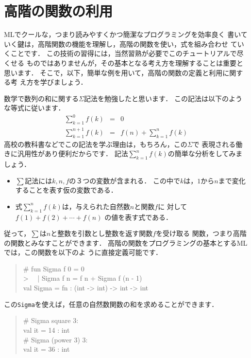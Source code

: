 \documentclass{jbook}
\newif\ifjp
\newcommand{\txt}[2]{#1}
\begin{document}
\section{\txt{高階の関数の利用}{Using higher-order functions}}
\label{sec:tutorialHeigher-order-use}


\ifjp%
	MLでクールな，つまり読みやすくかつ簡潔なプログラミングを効率良く
書いていく鍵は，高階関数の機能を理解し，高階の関数を使い，式を組み合わせ
ていくことです．
	この技術の習得には，当然習熟が必要でこのチュートリアルで尽くせる
ものではありませんが，その基本となる考え方を理解することは重要と思います．
	そこで，以下，簡単な例を用いて，高階の関数の定義と利用に関する考
え方を学びましょう．

	数学で数列の和に関する$\Sigma$記法を勉強したと思います．
	この記法は以下のような等式に従います．
\begin{eqnarray*}
\sum_{k=1}^0 f(k) &=& 0\\
\sum_{k=1}^{n+1} f(k) &=& f(n) + \sum_{k=1}^{n} f(k)
\end{eqnarray*}
	高校の教科書などでこの記法を学ぶ理由は，もちろん，この$\Sigma$で
表現される働きに汎用性があり便利だからです．
	記法$\sum_{k=1}^n f(k)$の簡単な分析をしてみましょう．
\begin{itemize}
\item $\sum$記法には$k,n,f$の３つの変数が含まれる．
この中で$k$は，$1$から$n$まで変化することを表す仮の変数である．
\item 式$\sum_{k=1}^n f(k)$は，与えられた自然数$n$と関数$f$に
対して
$
f(1) + f(2) + \cdots + f(n)
$
の値を表す式である．
\end{itemize}
	従って，$\sum$は$n$と整数を引数とし整数を返す関数$f$を受け取る
関数，つまり高階の関数とみなすことができます．
	高階の関数をプログラミングの基本とするMLでは，この関数を以下のよ
うに直接定義可能です．
\begin{tt}
\begin{quote}
\# fun Sigma f 0 = 0\\
> \ \  | Sigma f n = f n + Sigma f (n - 1)\\
val Sigma = fn : (int -> int) -> int -> int
\end{quote}
\end{tt}
この{\tt Sigma}を使えば，任意の自然数関数の和を求めることができます．
\begin{tt}
\begin{quote}
\# Sigma square 3:\\
val it = 14 : int\\
\# Sigma (power 3) 3:\\
val it = 36 : int
\end{quote}
\end{tt}
\end{document}
